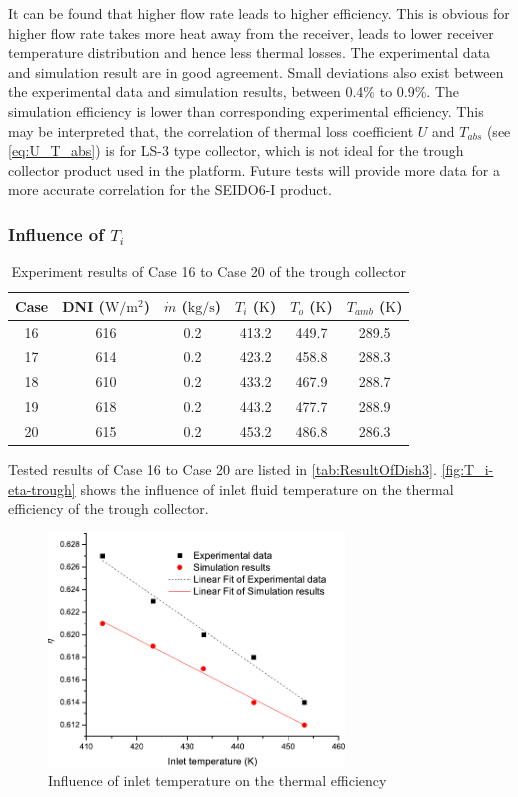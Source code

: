 It can be found that higher flow rate leads to higher efficiency. This is obvious for higher flow rate takes more heat away from the receiver, leads to lower receiver temperature distribution and hence less thermal losses. The experimental data and simulation result are in good agreement. Small deviations also exist between the experimental data and simulation results, between 0.4\% to 0.9\%. The simulation efficiency is lower than corresponding experimental efficiency. This may be interpreted that, the correlation of thermal loss coefficient $U$ and $T_{abs}$ (see \autoref{eq:U_T_abs}) is for LS-3 type collector, which is not ideal for the trough collector product used in the platform. Future tests will provide more data for a more accurate correlation for the SEIDO6-I product.

\subsubsection{Influence of $T_i$}

\begin{table}[htbp]\footnotesize
	\caption{Experiment results of Case 16 to Case 20 of the trough collector}
	\centering
	\begin{tabular}{cccccc}
		\toprule
		Case	& DNI ($\mathrm{W/m^2}$)	&	$\dot{m}$ ($\mathrm{kg/s}$)			&	$T_i$ ($\mathrm{K}$)	&	$T_o$ ($\mathrm{K}$)		&	$T_{amb}$ ($\mathrm{K}$)\\
		\midrule
		16	&	616	&	0.2	&	413.2	&	449.7	&	289.5\\
		17	&	614	&	0.2	&	423.2	&	458.8	&	288.3\\
		18	&	610	&	0.2	&	433.2	&	467.9	&	288.7	\\
		19	&	618	&	0.2	&	443.2	&	477.7	&	288.9\\
		20	&	615	&	0.2	&	453.2	&	486.8	&	286.3\\
		\bottomrule
	\end{tabular}
	
	\label{tab:ResultOfDish3}
\end{table}
Tested results of Case 16 to Case 20 are listed in \autoref{tab:ResultOfDish3}.
\autoref{fig:T_i-eta-trough} shows the influence of inlet fluid temperature on the thermal efficiency of the trough collector.
\begin{figure}[!ht]
\centering
\includegraphics[width=0.7\textwidth]{fig/T_i-eta-trough}
\caption{Influence of inlet temperature on the thermal efficiency}
\label{fig:T_i-eta-trough}
\end{figure}

